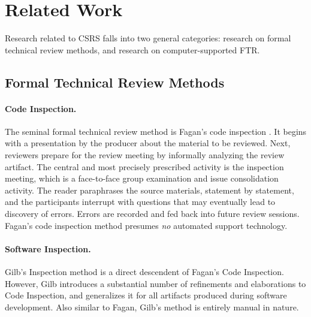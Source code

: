 
\section{Related Work}
\label{sec:related}

Research related to CSRS falls into two general categories: research on 
formal technical review methods, and research on computer-supported FTR.

\subsection{Formal Technical Review Methods}
\label{sidebar:ftr-methods}

\paragraph{Code Inspection.}

The seminal formal technical review method is Fagan's code inspection
\cite{Fagan86}.  It begins with a presentation by the producer
about the material to be reviewed.  Next, reviewers prepare for the review
meeting by informally analyzing the review artifact.  The central and most
precisely prescribed activity is the inspection meeting, which is a
face-to-face group examination and issue consolidation activity.  The
reader paraphrases the source materials, statement by statement, and the
participants interrupt with questions that may eventually lead to discovery
of errors.  Errors are recorded and fed back into future review sessions.
Fagan's code inspection method presumes {\em no} automated support
technology.

\paragraph{Software Inspection.}

Gilb's Inspection method \cite{Gilb93} is a direct descendent of Fagan's
Code Inspection. However, Gilb introduces a substantial number of
refinements and elaborations to Code Inspection, and generalizes it for all
artifacts produced during software development.  Also similar to Fagan,
Gilb's method is entirely manual in nature.

